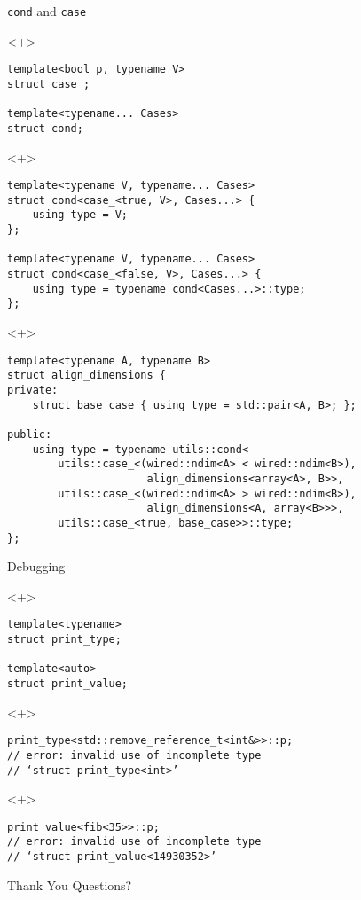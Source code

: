 \documentclass[table]{beamer}
\begin{document}
\begin{frame}[fragile]{\texttt{cond} and \texttt{case}}\
  \begin{onlyenv}<+>
    \begin{verbatim}
template<bool p, typename V>
struct case_;

template<typename... Cases>
struct cond;
    \end{verbatim}
  \end{onlyenv}


  \begin{onlyenv}<+>
    \begin{verbatim}
template<typename V, typename... Cases>
struct cond<case_<true, V>, Cases...> {
    using type = V;
};

template<typename V, typename... Cases>
struct cond<case_<false, V>, Cases...> {
    using type = typename cond<Cases...>::type;
};
    \end{verbatim}
  \end{onlyenv}

  \begin{onlyenv}<+>
    \begin{verbatim}
template<typename A, typename B>
struct align_dimensions {
private:
    struct base_case { using type = std::pair<A, B>; };

public:
    using type = typename utils::cond<
        utils::case_<(wired::ndim<A> < wired::ndim<B>),
                      align_dimensions<array<A>, B>>,
        utils::case_<(wired::ndim<A> > wired::ndim<B>),
                      align_dimensions<A, array<B>>>,
        utils::case_<true, base_case>>::type;
};
    \end{verbatim}
  \end{onlyenv}
\end{frame}

\begin{frame}[fragile]{Debugging}\
  \begin{onlyenv}<+>
    \begin{verbatim}
template<typename>
struct print_type;

template<auto>
struct print_value;
    \end{verbatim}
  \end{onlyenv}

  \begin{onlyenv}<+>
    \begin{verbatim}
print_type<std::remove_reference_t<int&>>::p;
// error: invalid use of incomplete type
// ‘struct print_type<int>’
    \end{verbatim}
  \end{onlyenv}

  \begin{onlyenv}<+>
    \begin{verbatim}
print_value<fib<35>>::p;
// error: invalid use of incomplete type
// ‘struct print_value<14930352>’
    \end{verbatim}
  \end{onlyenv}
\end{frame}

\begin{frame}{Thank You}
  Questions?
\end{frame}
\end{document}
